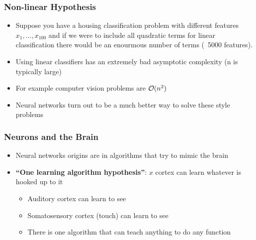 \subsubsection{Non-linear Hypothesis}
\begin{itemize}[--]
	\item Suppose you have a housing classification problem with different features $x_1, \ldots ,x_100$ and if we were to include all quadratic terms for linear classification there would be an enourmous number of terms (~5000 features).
	\item Using linear classifiers has an extremely bad asymptotic complexity (n is typically large)
	\item For example computer vision problems are $\mathcal{O}(n^2)$
	\item Neural networks turn out to be a much better way to solve these style problems
\end{itemize}

\subsubsection{Neurons and the Brain}
\begin{itemize}[--]
	\item Neural networks origins are in algorithms that try to mimic the brain
	\item \textbf{``One learning algorithm hypothesis''}: $x$ cortex can learn whatever is hooked up to it
	\begin{itemize}[--]
		\item Auditory cortex can learn to see
		\item Somatosensory cortex (touch) can learn to see
		\item There is one algorithm that can teach anything to do any function
	\end{itemize}
\end{itemize}

